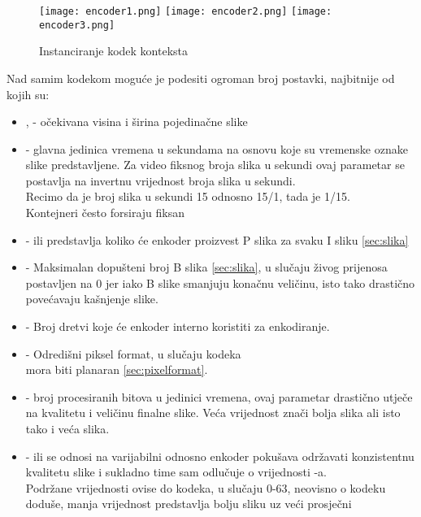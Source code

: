 \begin{figure} [h]
  \texttt{[image: encoder1.png]}
  \texttt{[image: encoder2.png]}
  \texttt{[image: encoder3.png]}
  \caption{Instanciranje kodek konteksta}
\end{figure}
\noindent
Nad samim kodekom moguće je podesiti ogroman broj postavki, najbitnije od kojih su: 
\begin{itemize}
  \item {},  - očekivana visina i širina pojedinačne slike
  \item {} - glavna jedinica vremena u sekundama na osnovu koje su vremenske oznake slike 
    predstavljene. Za video fiksnog broja slika u sekundi ovaj parametar se postavlja na invertnu vrijednost broja slika u sekundi. \\
    Recimo da je broj slika u sekundi 15 odnosno 15/1, tada je  1/15. \\
    Kontejneri često forsiraju fiksan 
  \item {} -  ili  predstavlja koliko će enkoder proizvest
   P slika za svaku I sliku \ref{sec:slika}
  \item {} - Maksimalan dopušteni broj B slika \ref{sec:slika}, u slučaju živog prijenosa postavljen na 0
   jer iako B slike smanjuju konačnu veličinu, isto tako drastično povećavaju kašnjenje slike.
  \item {} - Broj dretvi koje će enkoder interno koristiti za enkodiranje.
  \item {} - Odredišni piksel format, u slučaju  kodeka \\ mora biti planaran \ref{sec:pixelformat}.
  \item {} - broj procesiranih bitova u jedinici vremena, ovaj parametar drastično utječe na kvalitetu
    i veličinu finalne slike. Veća vrijednost znači bolja slika ali isto tako i veća slika.
  \item {} -  ili  se odnosi na varijabilni 
    odnosno enkoder pokušava održavati konzistentnu kvalitetu slike i sukladno time sam odlučuje o vrijednosti 
    -a. \label{sec:crf} \\
    Podržane vrijednosti ovise do kodeka, u slučaju  0-63, neovisno o kodeku doduše,
    manja vrijednost predstavlja bolju sliku uz veći prosječni 
\end{itemize}


